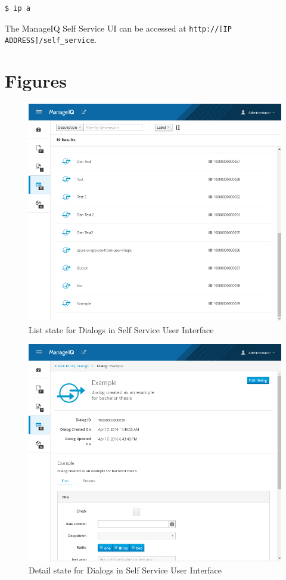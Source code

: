 \begin{lstlisting}[language=bash]
$ ip a
\end{lstlisting}

The ManageIQ Self Service UI can be accessed
at {\tt http://[IP ADDRESS]/self\_service}.

\chapter{Figures}

  \begin{figure}[h]
    \centering
    \def\svgwidth{\columnwidth}
    \includegraphics[width=15cm,keepaspectratio]{fig/dialog-list}
    \caption{List state for Dialogs in Self Service User Interface}
    \label{fig:dialog-list}
  \end{figure}

  \begin{figure}
    \centering
    \def\svgwidth{\columnwidth}
    \includegraphics[width=15cm,keepaspectratio]{fig/dialog-detail}
    \caption{Detail state for Dialogs in Self Service User Interface}
    \label{fig:dialog-detail}
  \end{figure}

